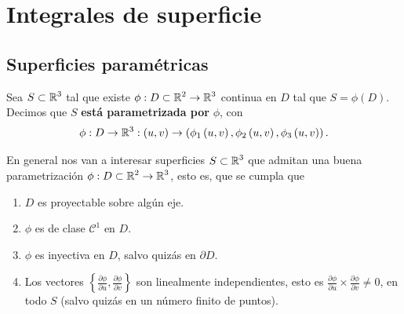 \chapter{Integrales de superficie}

\section{Superficies paramétricas}
\begin{definition}
Sea $\displaystyle S \subset \mathbb{R}^{3} $ tal que existe $\displaystyle \phi : D\subset \mathbb{R}^{2} \to \mathbb{R}^{3} $ continua en $\displaystyle D $ tal que $\displaystyle S = \phi\left(D\right) $. Decimos que $\displaystyle S $ \textbf{está parametrizada por} $\displaystyle \phi $, con
\[\phi: D \to \mathbb{R}^{3} : \left(u,v\right)\to \left(\phi_{1}\left(u,v\right), \phi_{2}\left(u,v\right), \phi_{3}\left(u,v\right)\right) .\]
\end{definition}
\begin{observation}
En general nos van a interesar superficies $\displaystyle S \subset \mathbb{R}^{3} $ que admitan una buena parametrización $\displaystyle \phi: D \subset \mathbb{R}^{2}\to \mathbb{R}^{3} $, esto es, que se cumpla que
\begin{enumerate}
\item $\displaystyle D $ es proyectable sobre algún eje.
\item $\displaystyle \phi $ es de clase $\displaystyle \mathcal{C}^{1} $ en $\displaystyle D $. 
\item $\displaystyle \phi $ es inyectiva en $\displaystyle D $, salvo quizás en $\displaystyle \partial D $. 
\item Los vectores $\displaystyle \left\{ \frac{\partial \phi}{\partial u}, \frac{\partial \phi}{\partial v}\right\}  $ son linealmente independientes, esto es $\displaystyle \frac{\partial \phi}{\partial u} \times \frac{\partial \phi}{\partial v}\neq 0 $, en todo $\displaystyle S $ (salvo quizás en un número finito de puntos).
\end{enumerate}
\end{observation}
